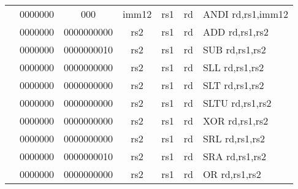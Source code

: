 \begin{table}[p]
\begin{small}
\begin{center}
\begin{tabular}{rcccccccccl}
&
\multicolumn{1}{|c|}{0000000} &
\multicolumn{2}{c|}{000} &
\multicolumn{4}{c|}{imm12} &
\multicolumn{1}{c|}{rs1} &
\multicolumn{1}{c|}{rd} & ANDI rd,rs1,imm12 \\
\cline{2-10}
  

&
\multicolumn{1}{|c|}{0000000} &
\multicolumn{5}{c|}{0000000000} &
\multicolumn{1}{c|}{rs2} &
\multicolumn{1}{c|}{rs1} &
\multicolumn{1}{c|}{rd} & ADD rd,rs1,rs2 \\
\cline{2-10}
  

&
\multicolumn{1}{|c|}{0000000} &
\multicolumn{5}{c|}{0000000010} &
\multicolumn{1}{c|}{rs2} &
\multicolumn{1}{c|}{rs1} &
\multicolumn{1}{c|}{rd} & SUB rd,rs1,rs2 \\
\cline{2-10}
  

&
\multicolumn{1}{|c|}{0000000} &
\multicolumn{5}{c|}{0000000000} &
\multicolumn{1}{c|}{rs2} &
\multicolumn{1}{c|}{rs1} &
\multicolumn{1}{c|}{rd} & SLL rd,rs1,rs2 \\
\cline{2-10}
  

&
\multicolumn{1}{|c|}{0000000} &
\multicolumn{5}{c|}{0000000000} &
\multicolumn{1}{c|}{rs2} &
\multicolumn{1}{c|}{rs1} &
\multicolumn{1}{c|}{rd} & SLT rd,rs1,rs2 \\
\cline{2-10}
  

&
\multicolumn{1}{|c|}{0000000} &
\multicolumn{5}{c|}{0000000000} &
\multicolumn{1}{c|}{rs2} &
\multicolumn{1}{c|}{rs1} &
\multicolumn{1}{c|}{rd} & SLTU rd,rs1,rs2 \\
\cline{2-10}
  

&
\multicolumn{1}{|c|}{0000000} &
\multicolumn{5}{c|}{0000000000} &
\multicolumn{1}{c|}{rs2} &
\multicolumn{1}{c|}{rs1} &
\multicolumn{1}{c|}{rd} & XOR rd,rs1,rs2 \\
\cline{2-10}
  

&
\multicolumn{1}{|c|}{0000000} &
\multicolumn{5}{c|}{0000000000} &
\multicolumn{1}{c|}{rs2} &
\multicolumn{1}{c|}{rs1} &
\multicolumn{1}{c|}{rd} & SRL rd,rs1,rs2 \\
\cline{2-10}
  

&
\multicolumn{1}{|c|}{0000000} &
\multicolumn{5}{c|}{0000000010} &
\multicolumn{1}{c|}{rs2} &
\multicolumn{1}{c|}{rs1} &
\multicolumn{1}{c|}{rd} & SRA rd,rs1,rs2 \\
\cline{2-10}
  

&
\multicolumn{1}{|c|}{0000000} &
\multicolumn{5}{c|}{0000000000} &
\multicolumn{1}{c|}{rs2} &
\multicolumn{1}{c|}{rs1} &
\multicolumn{1}{c|}{rd} & OR rd,rs1,rs2 \\
\cline{2-10}
  


\end{tabular}
\end{center}
\end{small}
\end{table}
